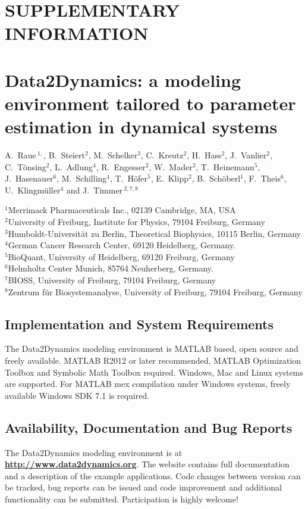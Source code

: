 \documentclass[12pt,a4paper]{scrartcl}
\begin{document}
\section*{SUPPLEMENTARY INFORMATION}
\section*{Data2Dynamics: a modeling environment tailored to parameter 
estimation in dynamical systems}

\noindent A.~Raue\,$^{1,}$, B.~Steiert$^{2}$, M.~Schelker$^{3}$, C.~Kreutz$^{2}$, H.~Hass$^{2}$, J.~Vanlier$^{2}$, C.~T\"onsing$^{2}$, L.~Adlung$^{4}$, R.~Engesser$^{2}$, W.~Mader$^{2}$, T.~Heinemann$^{5}$, J.~Hasenauer$^{6}$, M.~Schilling$^{4}$, T.~H\"ofer$^{5}$, E.~Klipp$^{2}$, B.~Sch\"oberl$^{1}$, F.~Theis$^{6}$, U.~Klingm\"uller$^{4}$ and J.~Timmer\,$^{2,7,8}$

\noindent $^{1}$Merrimack Pharmaceuticals Inc., 02139 Cambridge, MA, USA\\
$^{2}$University of Freiburg, Institute for Physics, 79104 Freiburg, Germany\\
$^{3}$Humboldt-Universit\"at zu Berlin, Theoretical Biophysics, 10115 Berlin, Germany\\
$^{4}$German Cancer Research Center, 69120 Heidelberg, Germany.\\
$^{5}$BioQuant, University of Heidelberg, 69120 Freiburg, Germany\\
$^{6}$Helmholtz Center Munich, 85764 Neuherberg, Germany.\\
$^{7}$BIOSS, University of Freiburg, 79104 Freiburg, Germany\\
$^{8}$Zentrum f\"ur Biosystemanalyse, University of Freiburg, 79104 Freiburg, 
Germany

\subsection*{Implementation and System Requirements} 
The Data2Dynamics modeling environment is MATLAB based, open source and freely available. MATLAB R2012 or later recommended, MATLAB Optimization Toolbox and Symbolic Math Toolbox required. Windows, Mac and Linux systems are supported. For MATLAB mex compilation under Windows systems, freely available Windows SDK 7.1 is required.

\subsection*{Availability, Documentation and Bug Reports}
The Data2Dynamics modeling environment is at \href{http://www.data2dynamics.org}{{\bf http://www.data2dynamics.org}}. The website contains full documentation and a description of the example applications. Code changes between version can be tracked, bug reports can be issued and code improvement and additional functionality can be submitted. Participation is highly welcome! 
\end{document}
